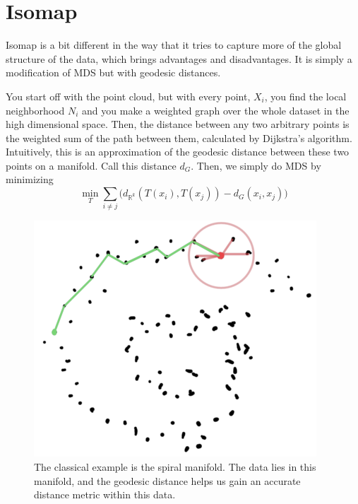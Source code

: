 \section{Isomap} 

  Isomap is a bit different in the way that it tries to capture more of the global structure of the data, which brings advantages and disadvantages. It is simply a modification of MDS but with geodesic distances. 

  \begin{definition}[Isomap]
    You start off with the point cloud, but with every point, $X_i$, you find the local neighborhood $N_i$ and you make a weighted graph over the whole dataset in the high dimensional space. Then, the distance between any two arbitrary points is the weighted sum of the path between them, calculated by Dijkstra's algorithm. Intuitively, this is an approximation of the geodesic distance between these two points on a manifold. Call this distance $d_G$. Then, we simply do MDS by minimizing 
    \begin{equation}
      \min_{T} \sum_{i \neq j} \big( d_{\mathbb{R}^k}(T(x_i), T(x_j)) - d_G(x_i, x_j) \big)
    \end{equation}

    \begin{figure}[H]
      \centering 
      \includegraphics[scale=0.4]{img/isomap.png}
      \caption{The classical example is the spiral manifold. The data lies in this manifold, and the geodesic distance helps us gain an accurate distance metric within this data. } 
      \label{fig:isomap}
    \end{figure}
  \end{definition}

